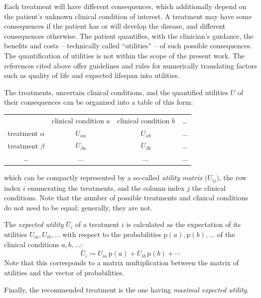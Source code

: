\documentclass[utf8]{FrontiersinHarvard_mod} %
\newcommand*{\pencil}{{\fontencoding{U}\fontfamily{fontawesometwo}\selectfont\symbol{210}}}
\newcommand{\mynotep}[1]{{\color{notecolour}\pencil\ #1}}
\newcommand*{\p}{\mathrm{p}}%
\renewcommand*{\|}[1][]{\nonscript\:#1\vert\nonscript\:\mathopen{}}
\newcommand*{\defd}{\coloneqq}
\newcommand*{\eU}{\bar{U}}
\begin{document}
Each treatment will have different consequences, which additionally depend on the patient's unknown clinical condition of interest. A treatment may have some consequences if the patient has or will develop the disease, and different consequences otherwise. The patient quantifies, with the clinician's guidance, the benefits and costs -- technically called \enquote{utilities} -- of such possible consequences. The quantification of utilities is not within the scope of the present work. The references cited above offer guidelines and rules for numerically translating factors such as quality of life and expected lifespan into utilities.

The treatments, uncertain clinical conditions, and the quantified utilities $U$ of their consequences can be organized into a table of this form:
  \begin{center}
    \begin{tabular}{cccc}
      &{\small clinical condition $a$}&{\small clinical condition $b$}&{\small \ldots}
      \\[2\jot]
      {\small treatment $\alpha$} & $U_{\alpha a}$ & $U_{\alpha b}$ &$\dotso$ \\[\jot]
      {\small treatment $\beta$} & $U_{\beta a}$ & $U_{\beta b}$ &$\dotso$ \\[\jot]
      {\small \ldots} &$\dotso$&$\dotso$&$\dotso$
    \end{tabular}
  \end{center}
which can be compactly represented by a so-called \emph{utility matrix} $\bigl(U_{ij})$, the row index $i$ enumerating the treatments, and the column index $j$ the clinical conditions. Note that the number of possible treatments and clinical conditions do not need to be equal; generally, they are not.

The \emph{expected utility} $\eU_{i}$ of a treatment $i$ is calculated as the expectation of its utilities $U_{ia}, U_{ib}, \dotsc$ with respect to the probabilities $\p(a), \p(b), \dotsc$ of the clinical conditions $a,b,\dotsc$:
\begin{equation}
  \label{eq:def_expected_utility}
  \eU_{i} \defd U_{ia}\, \p(a) + U_{ib}\, \p(b) + \dotsb
\end{equation}
Note that this corresponds to a matrix multiplication between the matrix of utilities and the vector of probabilities.

Finally, the recommended treatment is the one having \emph{maximal expected utility}.

\end{document}
